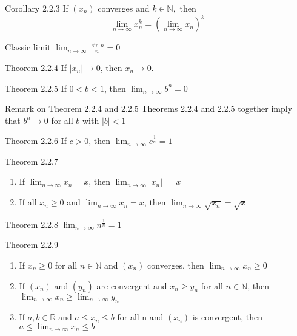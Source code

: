 \documentclass[10pt,landscape]{article}
\theoremstyle{definition}
\newcommand{\thistheoremname}{}
\newtheorem*{genericthm*}{\thistheoremname}
\newenvironment{namedthm*}[1]
{\renewcommand{\thistheoremname}{#1}\begin{genericthm*}}
{\end{genericthm*}}
\begin{document}
\begin{multicols}{3}
	\begin{namedthm*}{Corollary 2.2.3}
		If \(\left(x_{n}\right)\) converges and \(k \in \mathbb{N},\) then
		$$
			\lim _{n \rightarrow \infty} x_{n}^{k}=\left(\lim _{n \rightarrow \infty} x_{n}\right)^{k}
		$$
	\end{namedthm*}

	\begin{namedthm*}{Classic limit}
		\(\lim _{n \rightarrow \infty} \frac{\sin n}{n}=0\)
	\end{namedthm*}

	\begin{namedthm*}{Theorem 2.2.4}
		If \(|x_{n}| \rightarrow 0\), then \(x_{n} \rightarrow 0.\)
	\end{namedthm*}
	\begin{namedthm*}{Theorem 2.2.5}
		If \(0 < b < 1\), then \(\lim _{n \rightarrow \infty} b^{n}=0\)
	\end{namedthm*}

	\begin{namedthm*}{Remark on Theorem 2.2.4 and 2.2.5}
		Theorems 2.2.4 and 2.2.5 together imply that \(b^n \rightarrow 0\) for all \(b\) with \(|b| < 1\)
	\end{namedthm*}


	\begin{namedthm*}{Theorem 2.2.6}
		If \(c > 0\), then \(\lim_{n \rightarrow \infty}c^{\frac{1}{n}}=1\)
	\end{namedthm*}

	\begin{namedthm*}{Theorem 2.2.7}
		~
		\begin{enumerate}
			\item If \(\lim_{n \rightarrow \infty}{x_{n}} = x\), then \(\lim_{n \rightarrow \infty}{|x_{n}|} = |x|\)
			\item If all \(x_{n} \geq 0\) and \(\lim_{n \rightarrow \infty}{x_{n}} = x\), then \(\lim_{n \rightarrow \infty}{\sqrt{x_{n}}} = \sqrt{x}\)
		\end{enumerate}
	\end{namedthm*}

	\begin{namedthm*}{Theorem 2.2.8}
		\(\lim_{n \rightarrow \infty}{n^{\frac{1}{n}}}=1\)
	\end{namedthm*}


	\begin{namedthm*}{Theorem 2.2.9}
		~
		\begin{enumerate}
			\item If \(x_{n} \geq 0\) for all \(n \in \mathbb{N}\) and \((x_n)\) converges, then \(\lim_{n \rightarrow \infty}{x_{n}} \geq 0\)
			\item If \((x_{n})\) and \((y_{n})\) are convergent and \(x_{n} \geq y_{n}\) for all \(n \in \mathbb{N}\), then \(\lim_{n \rightarrow \infty}{x_{n}} \geq \lim_{n \rightarrow \infty}{y_{n}}\)
			\item If \(a,b \in \mathbb{R}\) and \(a \leq x_{n} \leq b\) for all n and \((x_n)\) is convergent, then \( a \leq \lim_{n \rightarrow \infty}{x_{n}} \leq b\)
		\end{enumerate}
	\end{namedthm*}


\end{multicols}
\end{document}
